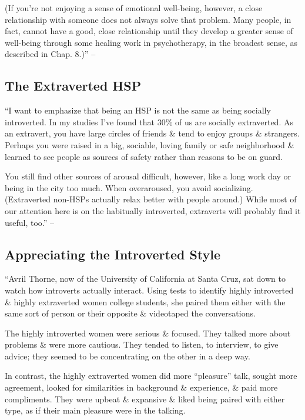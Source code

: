 \documentclass{article}
\numberwithin{equation}{section}
\begin{document}
(If you're not enjoying a sense of emotional well-being, however, a close relationship with someone does not always solve that problem. Many people, in fact, cannot have a good, close relationship until they develop a greater sense of well-being through some healing work in psychotherapy, in the broadest sense, as described in Chap. 8.)'' -- \cite[pp. 129--130]{Aron2013}

\subsection{The Extraverted HSP}
``I want to emphasize that being an HSP is not the same as being socially introverted. In my studies I've found that 30\% of us are socially extraverted. As an extravert, you have large circles of friends \& tend to enjoy groups \& strangers. Perhaps you were raised in a big, sociable, loving family or safe neighborhood \& learned to see people as sources of safety rather than reasons to be on guard.

You still find other sources of arousal difficult, however, like a long work day or being in the city too much. When overaroused, you avoid socializing. (Extraverted non-HSPs actually relax better with people around.) While most of our attention here is on the habitually introverted, extraverts will probably find it useful, too.'' -- \cite[p. 130]{Aron2013}

\subsection{Appreciating the Introverted Style}
``Avril Thorne, now of the University of California at Santa Cruz, sat down to watch how introverts actually interact. Using tests to identify highly introverted \& highly extraverted women college students, she paired them either with the same sort of person or their opposite \& videotaped the conversations.

The highly introverted women were serious \& focused. They talked more about problems \& were more cautious. They tended to listen, to interview, to give advice; they seemed to be concentrating on the other in a deep way.

In contrast, the highly extraverted women did more ``pleasure'' talk, sought more agreement, looked for similarities in background \& experience, \& paid more compliments. They were upbeat \& expansive \& liked being paired with either type, as if their main pleasure were in the talking.
\end{document}
